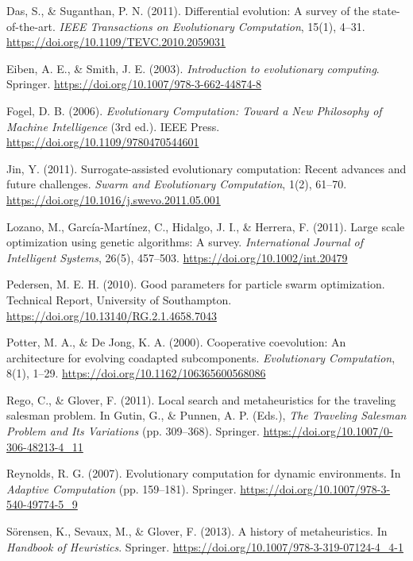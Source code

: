 \documentclass[10pt,a4paper]{article}
\begin{document}
\begin{multicols}{2}
\begin{thebibliography}{99}
Das, S., \& Suganthan, P. N. (2011). Differential evolution: A survey of the state-of-the-art. \textit{IEEE Transactions on Evolutionary Computation}, 15(1), 4–31. \url{https://doi.org/10.1109/TEVC.2010.2059031}

Eiben, A. E., \& Smith, J. E. (2003). \textit{Introduction to evolutionary computing}. Springer. \url{https://doi.org/10.1007/978-3-662-44874-8}

Fogel, D. B. (2006). \textit{Evolutionary Computation: Toward a New Philosophy of Machine Intelligence} (3rd ed.). IEEE Press. \url{https://doi.org/10.1109/9780470544601}

Jin, Y. (2011). Surrogate-assisted evolutionary computation: Recent advances and future challenges. \textit{Swarm and Evolutionary Computation}, 1(2), 61–70. \url{https://doi.org/10.1016/j.swevo.2011.05.001}

Lozano, M., García-Martínez, C., Hidalgo, J. I., \& Herrera, F. (2011). Large scale optimization using genetic algorithms: A survey. \textit{International Journal of Intelligent Systems}, 26(5), 457–503. \url{https://doi.org/10.1002/int.20479}

Pedersen, M. E. H. (2010). Good parameters for particle swarm optimization. Technical Report, University of Southampton. \url{https://doi.org/10.13140/RG.2.1.4658.7043}

Potter, M. A., \& De Jong, K. A. (2000). Cooperative coevolution: An architecture for evolving coadapted subcomponents. \textit{Evolutionary Computation}, 8(1), 1–29. \url{https://doi.org/10.1162/106365600568086}

Rego, C., \& Glover, F. (2011). Local search and metaheuristics for the traveling salesman problem. In Gutin, G., \& Punnen, A. P. (Eds.), \textit{The Traveling Salesman Problem and Its Variations} (pp. 309–368). Springer. \url{https://doi.org/10.1007/0-306-48213-4_11}

Reynolds, R. G. (2007). Evolutionary computation for dynamic environments. In \textit{Adaptive Computation} (pp. 159–181). Springer. \url{https://doi.org/10.1007/978-3-540-49774-5_9}

Sörensen, K., Sevaux, M., \& Glover, F. (2013). A history of metaheuristics. In \textit{Handbook of Heuristics}. Springer. \url{https://doi.org/10.1007/978-3-319-07124-4_4-1}


\end{thebibliography}
\end{multicols}
\end{document}

